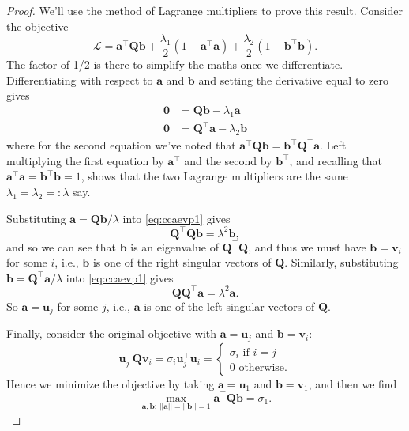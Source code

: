 \documentclass[]{book}
\theoremstyle{definition}
\theoremstyle{definition}
\theoremstyle{definition}
\theoremstyle{remark}
\begin{document}
\begin{proof}
{}We'll use the method of Lagrange multipliers to prove this result. Consider the objective
\[\mathcal{L} = \boldsymbol a^\top \boldsymbol Q\boldsymbol b+\frac{\lambda_1}{2}(1-\boldsymbol a^\top\boldsymbol a)+\frac{\lambda_2}{2} (1-\boldsymbol b^\top \boldsymbol b).\]
The factor of 1/2 is there to simplify the maths once we differentiate.
Differentiating with respect to \(\boldsymbol a\) and \(\boldsymbol b\) and setting the derivative equal to zero gives
\begin{align}
\boldsymbol 0&= \boldsymbol Q\boldsymbol b-\lambda_1 \boldsymbol a\label{eq:ccaevp1}\\
\boldsymbol 0&= \boldsymbol Q^\top\boldsymbol a-\lambda_2 \boldsymbol b\label{eq:ccaevp2}
\end{align}
where for the second equation we've noted that \(\boldsymbol a^\top \boldsymbol Q\boldsymbol b= \boldsymbol b^\top \boldsymbol Q^\top \boldsymbol a\).
Left multiplying the first equation by \(\boldsymbol a^\top\) and the second by \(\boldsymbol b^\top\), and recalling that \(\boldsymbol a^\top \boldsymbol a=\boldsymbol b^\top\boldsymbol b=1\), shows that the two Lagrange multipliers are the same \(\lambda_1 = \lambda_2 =: \lambda\) say.

Substituting \(\boldsymbol a=\boldsymbol Q\boldsymbol b/\lambda\) into \eqref{eq:ccaevp1} gives
\[\boldsymbol Q^\top\boldsymbol Q\boldsymbol b= \lambda^2\boldsymbol b,\]
and so we can see that \(\boldsymbol b\) is an eigenvalue of \(\boldsymbol Q^\top \boldsymbol Q\), and thus we must have \(\boldsymbol b= \boldsymbol v_i\) for some \(i\), i.e., \(\boldsymbol b\) is one of the right singular vectors of \(\boldsymbol Q\). Similarly, substituting \(\boldsymbol b= \boldsymbol Q^\top \boldsymbol a/\lambda\) into \eqref{eq:ccaevp1} gives
\[\boldsymbol Q\boldsymbol Q^\top \boldsymbol a= \lambda^2\boldsymbol a.\]
So \(\boldsymbol a=\boldsymbol u_j\) for some \(j\), i.e., \(\boldsymbol a\) is one of the left singular vectors of \(\boldsymbol Q\).

Finally, consider the original objective with \(\boldsymbol a=\boldsymbol u_j\) and \(\boldsymbol b=\boldsymbol v_i\):
\[\boldsymbol u_j^\top\boldsymbol Q\boldsymbol v_i = \sigma_i\boldsymbol u_j^\top \boldsymbol u_i = \begin{cases} \sigma_i \mbox{ if } i = j\\
0 \mbox{ otherwise.}
\end{cases}
\]
Hence we minimize the objective by taking \(\boldsymbol a=\boldsymbol u_1\) and \(\boldsymbol b=\boldsymbol v_1\), and then we find
\[\max_{\boldsymbol a, \boldsymbol b:\, \vert \vert \boldsymbol a\vert \vert=\vert \vert \boldsymbol b\vert \vert =1} \boldsymbol a^\top \boldsymbol Q\boldsymbol b=\sigma_1.\]
\end{proof}
\end{document}
